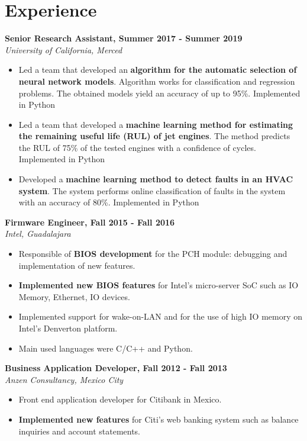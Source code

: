 \documentclass[a4paper,10pt]{article}
\begin{document}
\vspace{-2.5em}
\noindent\hrulefill
\vspace{1em}




\section{Experience}
\textbf{Senior Research Assistant, Summer 2017 - Summer 2019}\\
\emph{University of California, Merced}
\begin{itemize}
\item Led a team that developed an \textbf{algorithm for the automatic selection of neural network models}. Algorithm works for classification and regression problems. The 						obtained models yield an accuracy of up to 95\%. Implemented in Python
\item Led a team that developed a \textbf{machine learning method for estimating the remaining useful life (RUL) of jet engines}. The method predicts the RUL of 75\% of the 							tested engines with a confidence of  cycles. Implemented in Python
\item Developed a \textbf{machine learning method to detect faults in an HVAC system}. The system performs online classification of faults in the system with an accuracy of 80\%. Implemented in Python
\end{itemize}

\textbf{Firmware Engineer, Fall 2015 - Fall 2016}\\
\emph{Intel, Guadalajara}
\begin{itemize}
\item Responsible of \textbf{BIOS development} for the PCH module: debugging and implementation of new features.
\item \textbf{Implemented new BIOS features} for Intel's micro-server SoC such as IO Memory, Ethernet, IO devices.
\item Implemented support for wake-on-LAN and for the use of high IO memory on Intel's Denverton platform.
\item Main used languages were C/C++ and Python.
\end{itemize}

\textbf{Business Application Developer, Fall 2012 - Fall 2013}\\
\emph{Anzen Consultancy, Mexico City}
\begin{itemize}
\item Front end application developer for Citibank in Mexico.
\item \textbf{Implemented new features} for Citi's web banking system such as balance inquiries and account statements.
\end{itemize}
\end{document}
